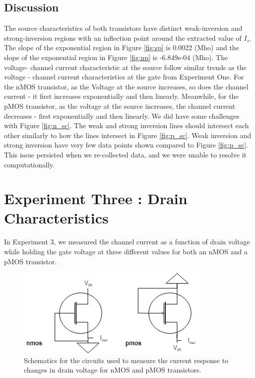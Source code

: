 \documentclass{article}
\begin{document}
\subsection{Discussion}
The source characteristics of both transistors have distinct weak-inversion and strong-inversion regions with an inflection point around the extracted value of $I_{s}$.
The slope of the exponential region in Figure \ref{fig:sp} is 0.0022 (Mho) and the slope of the exponential region in Figure \ref{fig:np} is -6.849e-04 (Mho). 
The voltage- channel current characteristic at the source follow similar trends as the voltage - channel current characteristics at the gate from  Experiment One. For the nMOS transistor, as the Voltage at the source increases, so does the channel current - it first increases exponentially and then linearly. Meanwhile, for the pMOS transistor, as the voltage at the source increases, the channel current decreases - first exponentially and then linearly. 
\newline
We did have some challenges with Figure \ref{fig:n_sc}.  The weak and strong inversion lines should intersect each other similarly to how the lines intersect in Figure \ref{fig:p_sc}.  Weak inversion and strong inversion have very few data points shown compared to Figure \ref{fig:p_sc}. This issue persisted when we re-collected data, and we were unable to resolve it computationally.
\section{Experiment Three : Drain Characteristics}
In Experiment 3, we measured the channel current as a function of drain voltage while holding the gate voltage at three different values for both an nMOS and a pMOS transistor.
\begin{figure}[H]   
  \centering        
  \includegraphics[scale = 0.5]{images/exp3_schematic.jpg}
  \caption{Schematics for the circuits used to measure the current response to changes in drain voltage for nMOS and pMOS transistors.}   
  \label{fig:exp2_sch}
\end{figure}
\end{document}
